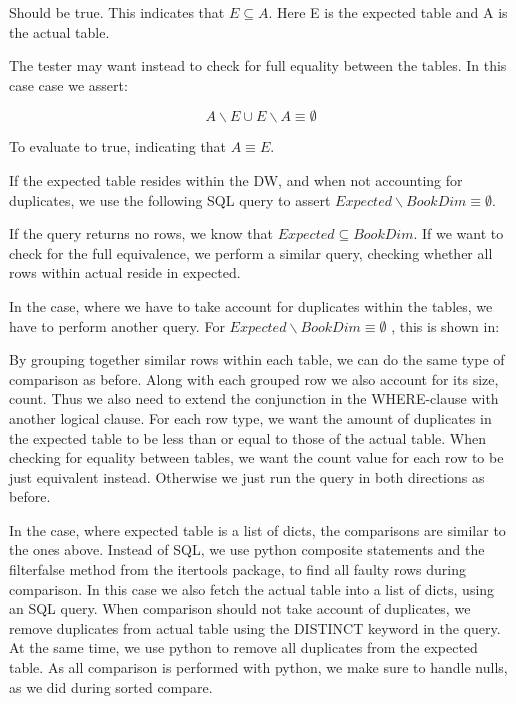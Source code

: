 Should be true. This indicates that  $E \subseteq A$. Here E is the expected table and A is the actual table. 

The tester may want instead to check for full equality between the tables. In this case case we assert:  
 
\[ A \backslash E \cup E \backslash A \equiv \emptyset \]

To evaluate to true, indicating that $A \equiv E$. 

If the expected table resides within the DW, and when not accounting for duplicates, we use the following SQL query to assert  $Expected \backslash BookDim \equiv \emptyset $.


If the query returns no rows, we know that $Expected \subseteq BookDim$. If we want to check for the full equivalence, we perform a similar query, checking whether all rows within actual reside in expected. 

In the case, where we have to take account for duplicates within the tables, we have to perform another query. For $Expected \backslash BookDim \equiv \emptyset$ , this is shown in:


By grouping together similar rows within each table, we can do the same type of comparison as before. Along with each grouped row we also account for its size, count. Thus we also need to extend the conjunction in the WHERE-clause with another logical clause. For each row type, we want the amount of duplicates in the expected table to be less than or equal to those of the actual table. When checking for equality between tables, we want the count value for each row to be just equivalent instead. Otherwise we just run the query in both directions as before.   

In the case, where expected table is a list of dicts, the comparisons are similar to the ones above. Instead of SQL, we use python composite statements and the filterfalse method from the itertools package, to find all faulty rows during comparison. In this case we also fetch the actual table into a list of dicts, using an SQL query.  When comparison should not take account of duplicates, we remove duplicates from actual table using the  DISTINCT keyword in the query. At the same time, we use python to remove all duplicates from the expected table. As all comparison is performed with python, we make sure to handle nulls, as we did during sorted compare.

